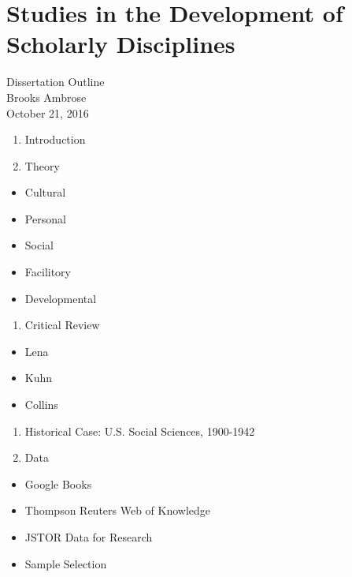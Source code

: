 \section{Studies in the Development of Scholarly
Disciplines}\label{studies-in-the-development-of-scholarly-disciplines}

Dissertation Outline\\
Brooks Ambrose\\
October 21, 2016

\begin{enumerate}
\def\labelenumi{\arabic{enumi}.}
\tightlist
\item
  Introduction
\item
  Theory\\
\end{enumerate}

\begin{itemize}
\tightlist
\item
  Cultural\\
\item
  Personal\\
\item
  Social\\
\item
  Facilitory\\
\item
  Developmental\\
\end{itemize}

\begin{enumerate}
\def\labelenumi{\arabic{enumi}.}
\setcounter{enumi}{2}
\tightlist
\item
  Critical Review
\end{enumerate}

\begin{itemize}
\tightlist
\item
  Lena
\item
  Kuhn
\item
  Collins
\end{itemize}

\begin{enumerate}
\def\labelenumi{\arabic{enumi}.}
\setcounter{enumi}{3}
\tightlist
\item
  Historical Case: U.S. Social Sciences, 1900-1942
\item
  Data
\end{enumerate}

\begin{itemize}
\tightlist
\item
  Google Books
\item
  Thompson Reuters Web of Knowledge
\item
  JSTOR Data for Research
\item
  Sample Selection
\end{itemize}

